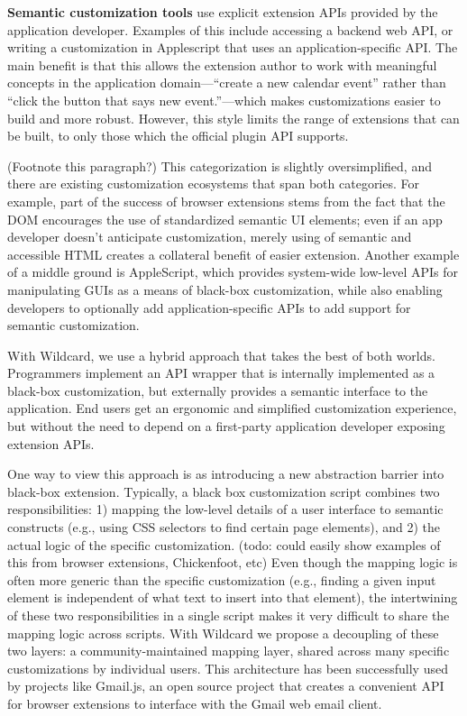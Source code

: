 \documentclass[sigplan,10pt,anonymous,review]{acmart}
\begin{document}
\textbf{Semantic customization tools} use explicit extension APIs
provided by the application developer. Examples of this include
accessing a backend web API, or writing a customization in Applescript
that uses an application-specific API. The main benefit is that this
allows the extension author to work with meaningful concepts in the
application domain---``create a new calendar event'' rather than ``click
the button that says new event.''---which makes customizations easier to
build and more robust. However, this style limits the range of
extensions that can be built, to only those which the official plugin
API supports.

(Footnote this paragraph?) This categorization is slightly
oversimplified, and there are existing customization ecosystems that
span both categories. For example, part of the success of browser
extensions stems from the fact that the DOM encourages the use of
standardized semantic UI elements; even if an app developer doesn't
anticipate customization, merely using of semantic and accessible HTML
creates a collateral benefit of easier extension. Another example of a
middle ground is AppleScript, which provides system-wide low-level APIs
for manipulating GUIs as a means of black-box customization, while also
enabling developers to optionally add application-specific APIs to add
support for semantic customization.

With Wildcard, we use a hybrid approach that takes the best of both
worlds. Programmers implement an API wrapper that is internally
implemented as a black-box customization, but externally provides a
semantic interface to the application. End users get an ergonomic and
simplified customization experience, but without the need to depend on a
first-party application developer exposing extension APIs.

One way to view this approach is as introducing a new abstraction
barrier into black-box extension. Typically, a black box customization
script combines two responsibilities: 1) mapping the low-level details
of a user interface to semantic constructs (e.g., using CSS selectors to
find certain page elements), and 2) the actual logic of the specific
customization. (todo: could easily show examples of this from browser
extensions, Chickenfoot, etc) Even though the mapping logic is often
more generic than the specific customization (e.g., finding a given
input element is independent of what text to insert into that element),
the intertwining of these two responsibilities in a single script makes
it very difficult to share the mapping logic across scripts. With
Wildcard we propose a decoupling of these two layers: a
community-maintained mapping layer, shared across many specific
customizations by individual users. This architecture has been
successfully used by projects like Gmail.js, an open source project that
creates a convenient API for browser extensions to interface with the
Gmail web email client.
\end{document}
